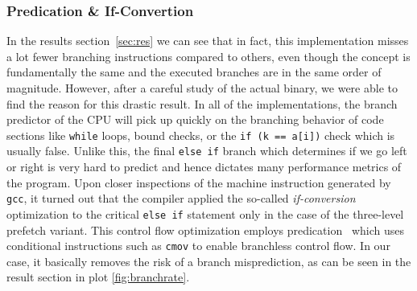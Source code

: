 \documentclass{article}
\begin{document}
\subsubsection{Predication \& If-Convertion}
\label{subsec:pred}
In the results section~\ref{sec:res} we can see that in fact, this implementation misses a lot fewer branching instructions compared to others, even though the concept is fundamentally the same and the executed branches are in the same order of magnitude. However, after a careful study of the actual binary, we were able to find the reason for this drastic result. In all of the implementations, the branch predictor of the CPU will pick up quickly on the branching behavior of code sections like \texttt{while} loops, bound checks, or the \texttt{if      (k == a[i])} check which is usually false. Unlike this, the final \texttt{else if} branch which determines if we go left or right is very hard to predict and hence dictates many performance metrics of the program. Upon closer inspections of the machine instruction generated by \texttt{gcc}, it turned out that the compiler applied the so-called \textit{if-conversion}~\cite{gcc-opt-manual} optimization to the critical \texttt{else if} statement only in the case of the three-level prefetch variant. This control flow optimization employs predication~\cite{10.1145/279358.279391} which uses conditional instructions such as \texttt{cmov} to enable branchless control flow. In our case, it basically removes the risk of a branch misprediction, as can be seen in the result section in plot \ref{fig:branchrate}.

\end{document}
